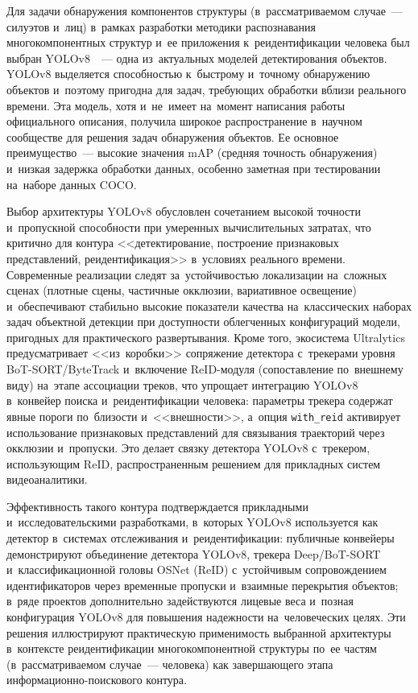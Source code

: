 Для задачи обнаружения компонентов структуры (в~рассматриваемом
случае~--- силуэтов и~лиц) в~рамках разработки методики
распознавания многокомпонентных структур и~ее приложения к~реидентификации
человека был выбран
YOLOv8~\cite{Solawetz2023yolov8,Reis2023yolov8flying}~--- одна из~актуальных моделей детектирования объектов. YOLOv8 выделяется способностью
к~быстрому и~точному обнаружению объектов и~поэтому пригодна для задач, требующих обработки вблизи реального времени.
Эта модель, хотя и~не~имеет на~момент написания работы официального
описания, получила широкое распространение в~научном сообществе для решения задач обнаружения объектов. Ее основное преимущество~--- высокие
значения mAP (средняя точность обнаружения) и~низкая задержка обработки
данных, особенно заметная при тестировании на~наборе данных COCO.

Выбор архитектуры YOLOv8 обусловлен сочетанием высокой точности
и~пропускной способности при умеренных вычислительных затратах, что
критично для контура <<детектирование, построение признаковых
представлений, реидентификация>> в~условиях реального времени.
Современные реализации следят за~устойчивостью локализации на~сложных
сценах (плотные сцены, частичные окклюзии, вариативное освещение)
и~обеспечивают стабильно высокие показатели качества на~классических
наборах задач объектной детекции при доступности облегченных
конфигураций модели, пригодных для практического развертывания. Кроме
того, экосистема Ultralytics предусматривает <<из~коробки>> сопряжение
детектора с~трекерами уровня BoT-SORT/ByteTrack и~включение ReID-модуля
(сопоставление по~внешнему виду) на~этапе ассоциации треков, что упрощает
интеграцию YOLOv8 в~конвейер поиска и~реидентификации человека:
параметры трекера содержат явные пороги по~близости и~<<внешности>>,
а~опция \texttt{with\_reid} активирует использование признаковых
представлений для связывания траекторий через окклюзии и~пропуски.
Это делает связку детектора YOLOv8 с~трекером, использующим ReID, распространенным решением для прикладных систем видеоаналитики.

Эффективность такого контура подтверждается прикладными
и~исследовательскими разработками, в~которых YOLOv8 используется как
детектор в~системах отслеживания и~реидентификации: публичные
конвейеры демонстрируют объединение детектора YOLOv8, трекера
Deep/BoT-SORT и~классификационной головы OSNet (ReID) с~устойчивым
сопровождением идентификаторов через временные пропуски и~взаимные
перекрытия объектов; в~ряде проектов дополнительно задействуются
лицевые веса и~позная конфигурация YOLOv8 для повышения надежности
на~человеческих целях. Эти решения иллюстрируют практическую
применимость выбранной архитектуры в~контексте реидентификации
многокомпонентной структуры по~ее частям (в~рассматриваемом случае~---
человека) как завершающего этапа информационно-поискового контура.


